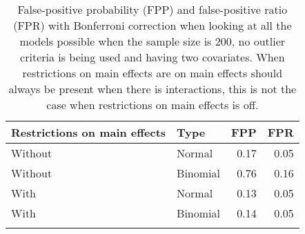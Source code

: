 \begin{longtable}{llrr}
\caption{False-positive probability (FPP) and false-positive ratio (FPR) with Bonferroni correction when looking at all the models possible when the sample size is 200, no outlier criteria is being used and having two covariates. When restrictions on main effects are on main effects should always be present when there is interactions, this is not the case when restrictions on main effects is off.} \\ 
  \hline
Restrictions on main effects & Type & FPP & FPR \\ 
  \hline
Without & Normal & 0.17 & 0.05 \\ 
  Without & Binomial & 0.76 & 0.16 \\ 
  With & Normal & 0.13 & 0.05 \\ 
  With & Binomial & 0.14 & 0.05 \\ 
   \hline
\hline
\label{tab:resultFullBC}
\end{longtable}
